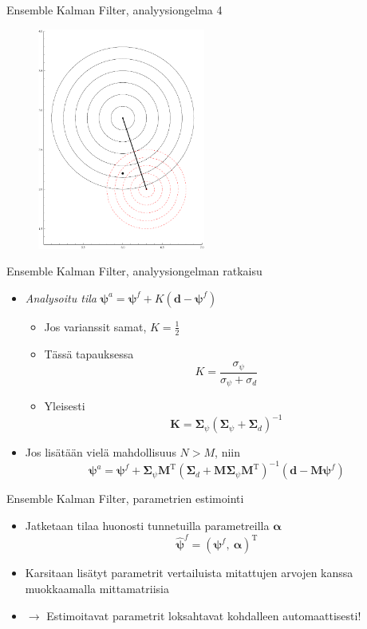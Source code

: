 \documentclass{beamer}
\begin{document}
\begin{frame}{Ensemble Kalman Filter, analyysiongelma 4}

\begin{figure}
\includegraphics[width=5.5cm]{enkf7.pdf}
\end{figure}

\end{frame}

\begin{frame}{Ensemble Kalman Filter, analyysiongelman ratkaisu}

\begin{itemize}
\item \emph{Analysoitu tila} $\boldsymbol{\psi}^a = \boldsymbol{\psi}^f + K\left(\boldsymbol{d}-\boldsymbol{\psi}^f\right)$
\begin{itemize}
\item Jos varianssit samat, $K = \frac{1}{2}$
\item Tässä tapauksessa \[ K = \frac{\sigma_\psi}{\sigma_\psi+\sigma_d} \]
\item Yleisesti \[ \mathbf{K} = \boldsymbol{\Sigma}_\psi\left(\boldsymbol{\Sigma}_\psi+\boldsymbol{\Sigma}_d\right)^{-1} \]
\end{itemize}
\item Jos lisätään vielä mahdollisuus $N > M$, niin 
\[
\boldsymbol{\psi}^a = \boldsymbol{\psi}^f + \boldsymbol{\Sigma}_\psi \mathbf{M}^\mathrm{T} \left(\boldsymbol{\Sigma}_d+\mathbf{M}\boldsymbol{\Sigma}_\psi\mathbf{M}^\mathrm{T}\right)^{-1}\left(\boldsymbol{d}-\mathbf{M}\boldsymbol{\psi}^f\right)
\]
\end{itemize}

\end{frame}

\begin{frame}{Ensemble Kalman Filter, parametrien estimointi}

\begin{itemize}
\item Jatketaan tilaa huonosti tunnetuilla parametreilla $\boldsymbol{\alpha}$
\[ \boldsymbol{\hat{\psi}}^f = \left(\boldsymbol{\psi}^f,~\boldsymbol{\alpha}\right)^\mathrm{T} \]
\item Karsitaan lisätyt parametrit vertailuista mitattujen arvojen kanssa muokkaamalla mittamatriisia
\item $\rightarrow$ Estimoitavat parametrit loksahtavat kohdalleen automaattisesti!
\end{itemize}

\end{frame}
\end{document}

